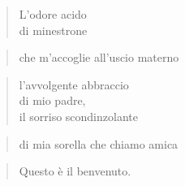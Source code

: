 
\begin{verse}
    L'odore acido\\
    di minestrone\\
    
\end{verse}

\vspace{-0.9cm}
\begin{verse}che m'accoglie all'uscio \hfill materno \end{verse}
\vspace{-0.9cm}

\begin{verse}
    l'avvolgente abbraccio\\
    di mio padre,\\
    il sorriso scondinzolante\\
\end{verse}

\vspace{-0.9cm}
\begin{verse} di mia sorella \hfill che chiamo amica \end{verse}

\begin{verse}
    Questo è il benvenuto.
\end{verse}